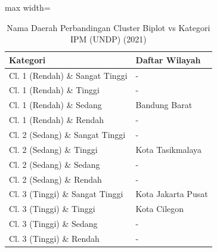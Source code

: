 \begin{table}[H]
\centering
\caption{Nama Daerah Perbandingan Cluster Biplot vs Kategori IPM (UNDP) (2021)} \makeatletter{}\makeatother
\begin{adjustbox}{max width=\textwidth}
\begin{tabular}{|p{4cm}|p{10cm}|}
\hline
\textbf{Kategori} & \textbf{Daftar Wilayah} \\
\hline
Cl. 1 (Rendah) \& Sangat Tinggi & - \\
\hline
Cl. 1 (Rendah) \& Tinggi & - \\
\hline
Cl. 1 (Rendah) \& Sedang & Bandung Barat \\
\hline
Cl. 1 (Rendah) \& Rendah & - \\
\hline
Cl. 2 (Sedang) \& Sangat Tinggi & - \\
\hline
Cl. 2 (Sedang) \& Tinggi & Kota Tasikmalaya \\
\hline
Cl. 2 (Sedang) \& Sedang & - \\
\hline
Cl. 2 (Sedang) \& Rendah & - \\
\hline
Cl. 3 (Tinggi) \& Sangat Tinggi & Kota Jakarta Pusat \\
\hline
Cl. 3 (Tinggi) \& Tinggi & Kota Cilegon \\
\hline
Cl. 3 (Tinggi) \& Sedang & - \\
\hline
Cl. 3 (Tinggi) \& Rendah & - \\
\hline
\end{tabular}
\end{adjustbox}
\end{table}